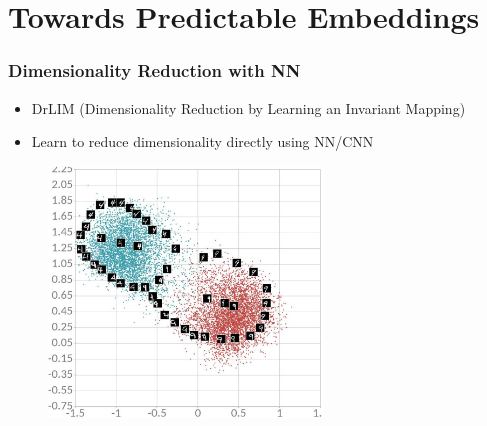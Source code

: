 \documentclass[10pt]{beamer}
\begin{document}
\section{Towards Predictable Embeddings}
\begin{frame}
    \frametitle{Dimensionality Reduction with NN}
    \begin{itemize}
        \item DrLIM (Dimensionality Reduction by Learning an Invariant Mapping)
        \item Learn to reduce dimensionality directly using NN/CNN
    \end{itemize}

    \begin{figure}[h]
        \begin{center}
            \includegraphics[width=0.65\textwidth]{../report/thesis_figures/mnist_cl_drlim.jpg}
        \end{center}
    \end{figure}
\end{frame}
\end{document}
